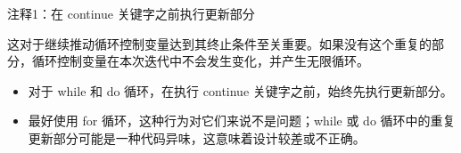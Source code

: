 
{\footnotesize
注释1：在 continue 关键字之前执行更新部分
}

这对于继续推动循环控制变量达到其终止条件至关重要。如果没有这个重复的部分，循环控制变量在本次迭代中不会发生变化，并产生无限循环。


\begin{itemize}
\item
对于 while 和 do 循环，在执行 continue 关键字之前，始终先执行更新部分。

\item
最好使用 for 循环，这种行为对它们来说不是问题；while 或 do 循环中的重复更新部分可能是一种代码异味，这意味着设计较差或不正确。
\end{itemize}
